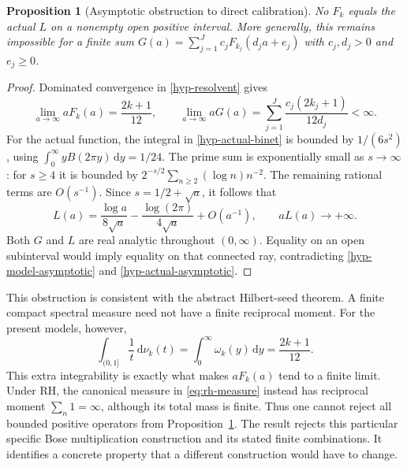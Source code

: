 \documentclass[11pt,a4paper]{article}
\numberwithin{equation}{section}
\newtheorem{proposition}[theorem]{Proposition}
\theoremstyle{definition}
\theoremstyle{remark}
\newcommand{\dd}{\,\mathrm d}
\begin{document}
\begin{proposition}[Asymptotic obstruction to direct calibration]
\label{hyp-obstruction}
No $F_k$ equals the actual $L$ on a nonempty open positive interval.
More generally, this remains impossible for a finite sum
$G(a)=\sum_{j=1}^{J}c_jF_{k_j}(d_ja+e_j)$ with
$c_j,d_j>0$ and $e_j\geq0$.
\end{proposition}
\begin{proof}
Dominated convergence in \eqref{hyp-resolvent} gives
\begin{equation}\label{hyp-model-asymptotic}
\lim_{a\to\infty}aF_k(a)=\frac{2k+1}{12},\qquad
\lim_{a\to\infty}aG(a)=
\sum_{j=1}^{J}\frac{c_j(2k_j+1)}{12d_j}<\infty.
\end{equation}
For the actual function, the integral in \eqref{hyp-actual-binet}
is bounded by $1/(6s^2)$, using
$\int_0^\infty yB(2\pi y)\dd y=1/24$.
The prime sum is exponentially small as $s\to\infty$:
for $s\geq4$ it is bounded by
$2^{-s/2}\sum_{n\geq2}(\log n)n^{-2}$.
The remaining rational terms are $O(s^{-1})$. Since
$s=1/2+\sqrt a$, it follows that
\begin{equation}\label{hyp-actual-asymptotic}
L(a)=\frac{\log a}{8\sqrt a}
-\frac{\log(2\pi)}{4\sqrt a}+O(a^{-1}),
\qquad aL(a)\longrightarrow+\infty.
\end{equation}
Both $G$ and $L$ are real analytic throughout $(0,\infty)$.
Equality on an open subinterval would imply equality on that connected
ray, contradicting \eqref{hyp-model-asymptotic} and
\eqref{hyp-actual-asymptotic}.
\end{proof}

This obstruction is consistent with the abstract Hilbert-seed theorem.
A finite compact spectral measure need not have a finite reciprocal
moment. For the present models, however,
\begin{equation}\label{hyp-reciprocal-moment}
\int_{(0,1]}\frac1t\dd\nu_k(t)
=\int_0^\infty\omega_k(y)\dd y=\frac{2k+1}{12}.
\end{equation}
This extra integrability is exactly what makes $aF_k(a)$ tend to
a finite limit. Under RH, the canonical measure in
\eqref{eq:rh-measure} instead has reciprocal moment
$\sum_n1=\infty$, although its total mass is finite. Thus one
cannot reject all bounded positive operators from
Proposition~\ref{hyp-obstruction}. The result rejects this particular
specific Bose multiplication construction and its stated finite combinations.
It identifies a concrete property that a different construction would
have to change.
\end{document}
